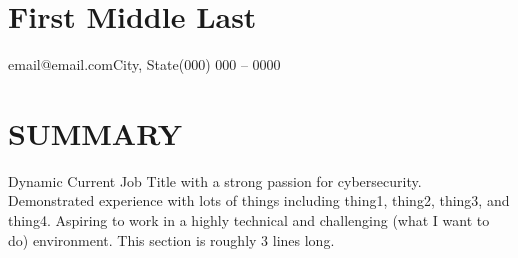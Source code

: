 \documentclass[11pt]{article}
\begin{document}

\newcommand{\shortitem}[3]{
  \def\temp{#3}\ifx\temp\empty
  \textbf{#1}
  \else
  \textbf{#1} -- #3
  \fi
  \hfill #2\\[2pt]}

\newcommand{\longitem}[3]{
  \textbf{#1} \hfill #2\\
  \begin{adjustwidth}{0.4cm}{2.2cm}
    #3
    \\[2pt]\end{adjustwidth}}
    
\newcommand{\indentedSubitem}[3]{
  \def\temp{#3}\ifx\temp\empty
  \textbf{#1}
  \else
  \textbf{#1} #3
  \fi
  \hfill #2\\[2pt]}

\newcommand{\sbt}[0]{\,\begin{picture}(-1,1)(-1,-3)\circle*{3}\end{picture} \ }


\newcommand{\myFullName}	{First Middle Last}
\newcommand{\myEmail}		{email@email.com}
\newcommand{\myCityState}	{City, State}
\newcommand{\myPhone}		{(000) 000 -- 0000}


\section*{\hfill\LARGE \myFullName \hfill}
\myEmail \hfill \myCityState \hfill \myPhone

\section*{SUMMARY}
Dynamic Current Job Title with a strong passion for cybersecurity. Demonstrated experience with lots of things including thing1, thing2, thing3, and thing4. Aspiring to work in a highly technical and challenging (what I want to do) environment. This section is roughly 3 lines long.
\end{document}
